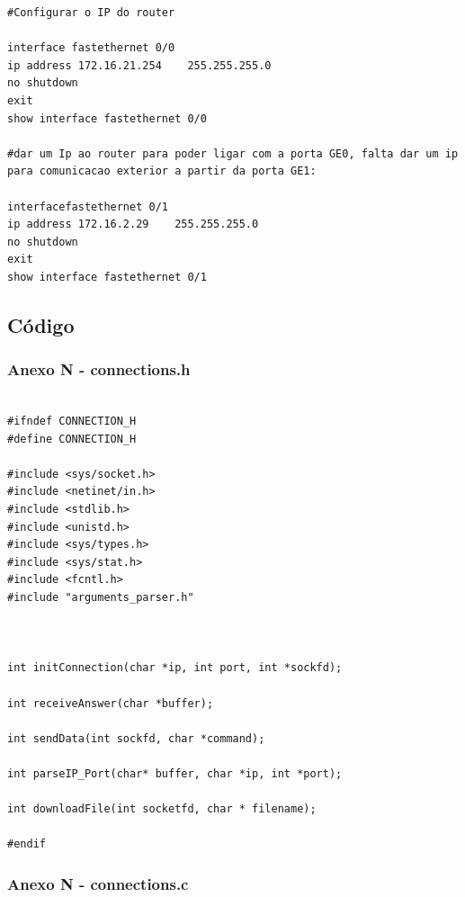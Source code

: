 \documentclass[11pt]{article}
\begin{document}
\begin{lstlisting}[style=bashStyle]
#Configurar o IP do router

interface fastethernet 0/0                 
ip address 172.16.21.254    255.255.255.0   
no shutdown
exit
show interface fastethernet 0/0

#dar um Ip ao router para poder ligar com a porta GE0, falta dar um ip para comunicacao exterior a partir da porta GE1:

interfacefastethernet 0/1                 
ip address 172.16.2.29    255.255.255.0      
no shutdown
exit
show interface fastethernet 0/1  
\end{lstlisting}

\pagebreak


\subsection{Código}

\subsubsection{ Anexo N - connections.h}

\begin{lstlisting}[style=CStyle]

#ifndef CONNECTION_H
#define CONNECTION_H

#include <sys/socket.h>
#include <netinet/in.h>
#include <stdlib.h>
#include <unistd.h>
#include <sys/types.h>
#include <sys/stat.h>
#include <fcntl.h>
#include "arguments_parser.h"



int initConnection(char *ip, int port, int *sockfd);

int receiveAnswer(char *buffer);

int sendData(int sockfd, char *command);

int parseIP_Port(char* buffer, char *ip, int *port);

int downloadFile(int socketfd, char * filename);

#endif

\end{lstlisting}

\subsubsection{ Anexo N - connections.c}
\end{document}
